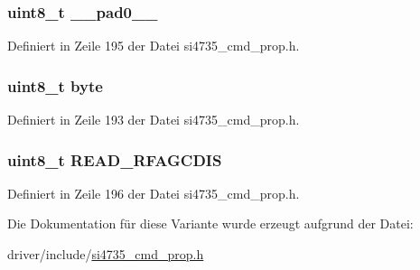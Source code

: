 \subsubsection[{\+\_\+\+\_\+pad0\+\_\+\+\_\+}]{\setlength{\rightskip}{0pt plus 5cm}uint8\+\_\+t \+\_\+\+\_\+pad0\+\_\+\+\_\+}\label{unionfm__agc__status__resp1_a8b4eebe79ded0459acec2f4950102ba3}


Definiert in Zeile 195 der Datei si4735\+\_\+cmd\+\_\+prop.\+h.

\hypertarget{unionfm__agc__status__resp1_a96f44d20f1dbf1c8785a7bc99a46164c}{}
\subsubsection[{byte}]{\setlength{\rightskip}{0pt plus 5cm}uint8\+\_\+t byte}\label{unionfm__agc__status__resp1_a96f44d20f1dbf1c8785a7bc99a46164c}


Definiert in Zeile 193 der Datei si4735\+\_\+cmd\+\_\+prop.\+h.

\hypertarget{unionfm__agc__status__resp1_a9cfeacf28a9e2117d6dab03603563164}{}
\subsubsection[{R\+E\+A\+D\+\_\+\+R\+F\+A\+G\+C\+D\+I\+S}]{\setlength{\rightskip}{0pt plus 5cm}uint8\+\_\+t R\+E\+A\+D\+\_\+\+R\+F\+A\+G\+C\+D\+I\+S}\label{unionfm__agc__status__resp1_a9cfeacf28a9e2117d6dab03603563164}


Definiert in Zeile 196 der Datei si4735\+\_\+cmd\+\_\+prop.\+h.



Die Dokumentation für diese Variante wurde erzeugt aufgrund der Datei\+:\begin{DoxyCompactItemize}
\item 
driver/include/\hyperlink{si4735__cmd__prop_8h}{si4735\+\_\+cmd\+\_\+prop.\+h}\end{DoxyCompactItemize}
